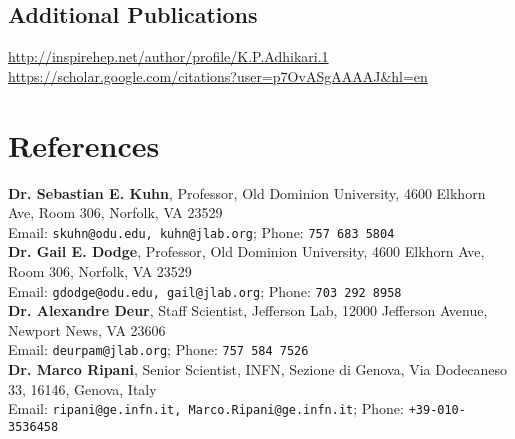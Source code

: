 \documentclass[10pt, letterpaper]{article}
\begin{document}
\subsection*{Additional Publications}
\noindent
\url{http://inspirehep.net/author/profile/K.P.Adhikari.1} \\
\url{https://scholar.google.com/citations?user=p7OvASgAAAAJ\&hl=en}






\section*{References}
\textbf{Dr. Sebastian E. Kuhn}, Professor, Old Dominion University, 4600 Elkhorn Ave, Room 306, Norfolk, VA 23529 \\
Email: \texttt{skuhn@odu.edu, kuhn@jlab.org}; Phone: \texttt{757 683 5804} \\

\textbf{Dr. Gail E. Dodge}, Professor, Old Dominion University, 4600 Elkhorn Ave, Room 306, Norfolk, VA 23529 \\
Email: \texttt{gdodge@odu.edu, gail@jlab.org}; Phone: \texttt{703 292 8958}\\

\textbf{Dr. Alexandre Deur}, Staff Scientist, Jefferson Lab, 12000 Jefferson Avenue, Newport News, VA 23606 \\
Email: \texttt{deurpam@jlab.org}; Phone: \texttt{757 584 7526}\\ 

\textbf{Dr. Marco Ripani}, Senior Scientist, INFN, Sezione di Genova, Via Dodecaneso 33, 16146, Genova, Italy \\
Email: \texttt{ripani@ge.infn.it, Marco.Ripani@ge.infn.it}; Phone: \texttt{+39-010-3536458}\\
\end{document}
